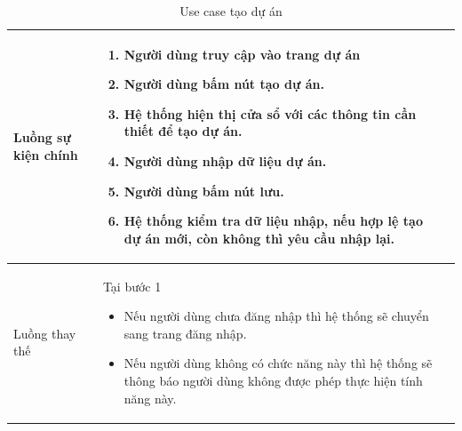 \documentclass[12pt,a4paper]{article}
\begin{document}
\begin{table}[H]
\begin{tabular}{|p{3.5cm}|p{11.5cm}|c|}
            Luồng sự kiện chính & \vspace{-.8cm}\begin{enumerate}
                                                    \item Người dùng truy cập vào trang dự án
                                                    \item  Người dùng bấm nút tạo dự án.
                                                    \item  Hệ thống hiện thị cửa sổ với các thông tin cần thiết để tạo dự án.
                                                    \item  Người dùng nhập dữ liệu dự án.
                                                    \item Người dùng bấm nút lưu.
                                                    \item Hệ thống kiểm tra dữ liệu nhập, nếu hợp lệ tạo dự án mới, còn không thì yêu cầu nhập lại.
            \end{enumerate}
            \\
            \hline
            Luồng thay thế & Tại bước 1\newline
            \vspace{-.8cm}\begin{itemize}
                              \item Nếu người dùng chưa đăng nhập thì hệ thống sẽ chuyển sang trang đăng nhập.
                              \item  Nếu người dùng không có chức năng này thì hệ thống sẽ thông báo người dùng không được phép thực hiện tính năng này.
            \end{itemize}
            \\
            \hline
        \end{tabular}
        \caption{Use case tạo dự án}
    \end{table}


\end{document}
